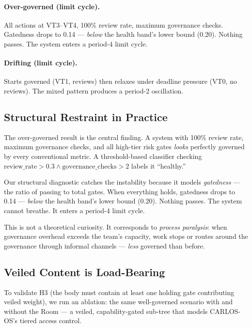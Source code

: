 \documentclass[sigconf,nonacm]{acmart}
\begin{document}
\paragraph{Over-governed (limit cycle).}
All actions at VT3--VT4, 100\% review rate, maximum governance checks.
Gatedness drops to 0.14 --- \emph{below} the health band's lower bound
(0.20). Nothing passes. The system enters a period-4 limit cycle.

\paragraph{Drifting (limit cycle).}
Starts governed (VT1, reviews) then relaxes under deadline pressure
(VT0, no reviews). The mixed pattern produces a period-2 oscillation.


\subsection{Structural Restraint in Practice}\label{sec:overgovernance}

The over-governed result is the central finding. A system with 100\%
review rate, maximum governance checks, and all high-tier risk gates
\emph{looks} perfectly governed by every conventional metric. A
threshold-based classifier checking
$\mathrm{review\_rate} > 0.3 \wedge \mathrm{governance\_checks} > 2$
labels it ``healthy.''

Our structural diagnostic catches the instability because it models
\emph{gatedness} --- the ratio of passing to total gates. When everything
holds, gatedness drops to 0.14 --- \emph{below} the health band's lower
bound (0.20). Nothing passes. The system cannot breathe. It enters a
period-4 limit cycle.

This is not a theoretical curiosity. It corresponds to \emph{process
paralysis}: when governance overhead exceeds the team's capacity, work
stops or routes around the governance through informal channels ---
\emph{less} governed than before.


\subsection{Veiled Content is Load-Bearing}\label{sec:veiled}

To validate H3 (the body must contain at least one holding gate
contributing veiled weight), we run an ablation: the same well-governed
scenario with and without the Room --- a veiled, capability-gated
sub-tree that models CARLOS-OS's tiered access control.
\end{document}
